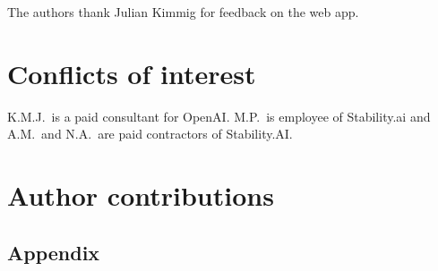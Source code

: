 \documentclass[11pt, oneside]{article}
\begin{document}
\begin{refsection}
The authors thank Julian Kimmig for feedback on the web app. 

\section*{Conflicts of interest}
K.M.J.\ is a paid consultant for OpenAI. M.P.\ is employee of Stability.ai and A.M.\ and N.A.\ are paid contractors of Stability.AI.

\section*{Author contributions}

\footnotesize
\insertcredits
\normalsize
\printbibliography
\end{refsection}


\clearpage
\begin{refsection}
\appendix
\section{Appendix}


\printbibliography[heading=subbibintoc]
\end{refsection}
\end{document}
